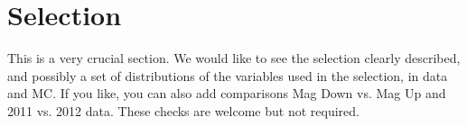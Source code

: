 \section{Selection}
This is a very crucial section. We would like to 
see the selection clearly described, and possibly 
a set of distributions of the variables 
used in the selection, in data and MC.
If you like, you can also add comparisons Mag Down vs. 
Mag Up and 2011 vs. 2012 data.
These checks are welcome but not required.

